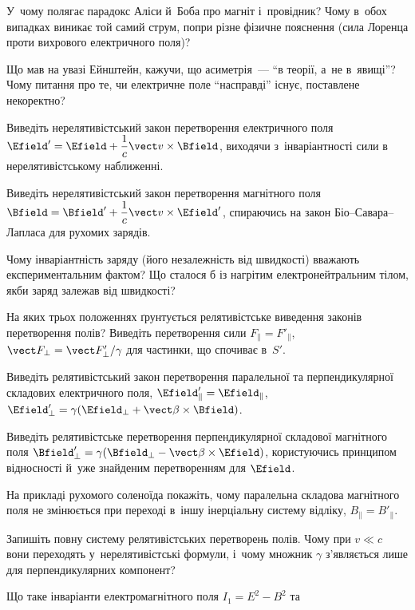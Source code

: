 \begin{Questions}
\begin{quizlist}
	\item У~чому полягає парадокс Аліси й~Боба про магніт і~провідник? Чому в~обох
	  випадках виникає той самий струм, попри різне фізичне пояснення (сила Лоренца проти
	  вихрового електричного поля)?
	\item Що мав на увазі Ейнштейн, кажучи, що асиметрія~--- \enquote{в теорії, а~не в~явищі}?
	  Чому питання про те, чи електричне поле \enquote{насправді} існує, поставлене некоректно?
	\item Виведіть нерелятивістський закон перетворення електричного поля $\Efield' =
	  \Efield + \dfrac1c\vect v\times\Bfield$, виходячи з~інваріантності сили в
	  нерелятивістському наближенні.
	\item Виведіть нерелятивістський закон перетворення магнітного поля $\Bfield =
	  \Bfield' + \dfrac1c\vect v\times\Efield'$, спираючись на закон Біо--Савара--Лапласа для
	  рухомих зарядів.
	\item Чому інваріантність заряду (його незалежність від швидкості) вважають
	  експериментальним фактом? Що сталося б із нагрітим електронейтральним тілом, якби
	  заряд залежав від швидкості?
	\item На яких трьох положеннях ґрунтується релятивістське виведення законів
	  перетворення полів? Виведіть перетворення сили $F_\parallel=F'_\parallel$, $\vect
	  F_\perp = \vect F'_\perp/\gamma$ для частинки, що спочиває в~$S'$.
	\item Виведіть релятивістський закон перетворення паралельної та перпендикулярної
	  складових електричного поля, $\Efield'_\parallel=\Efield_\parallel$,
	  $\Efield'_\perp=\gamma(\Efield_\perp+\vect\beta\times\Bfield)$.
	\item Виведіть релятивістське перетворення перпендикулярної складової магнітного поля
	  $\Bfield'_\perp = \gamma(\Bfield_\perp - \vect\beta\times\Efield)$, користуючись
	  принципом відносності й~уже знайденим перетворенням для $\Efield$.
	\item На прикладі рухомого соленоїда покажіть, чому паралельна складова магнітного
	  поля не змінюється при переході в~іншу інерціальну систему відліку, $B_\parallel =
	  B'_\parallel$.
	\item Запишіть повну систему релятивістських перетворень полів. Чому при $v\ll c$ вони
	  переходять у~нерелятивістські формули, і~чому множник $\gamma$ з'являється лише для
	  перпендикулярних компонент?
	\item Що таке інваріанти електромагнітного поля $I_1=E^2-B^2$ та

\end{quizlist}
\end{Questions}
